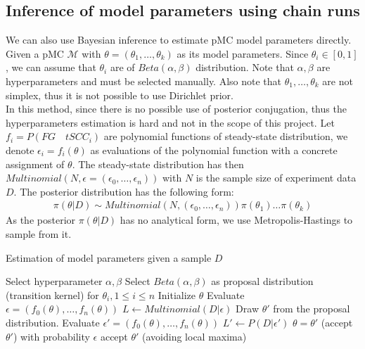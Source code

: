 \documentclass[12pt]{article}
\theoremstyle{definition}
\begin{document}
\subsection{Inference of model parameters using chain runs}
We can also use Bayesian inference to estimate pMC model parameters directly.
Given a pMC $\mathcal{M}$ with $\theta=(\theta_1,\ldots,\theta_k)$ as its model
parameters. Since $\theta_i \in [0,1]$, we can assume that $\theta_i$ are of
$Beta(\alpha, \beta)$ distribution. Note that $\alpha, \beta$ are
hyperparameters and must be selected manually. Also note that
$\theta_1,\ldots,\theta_k$ are not simplex, thus it is not possible to use
Dirichlet prior. \\
In this method, since there is no possible use of posterior conjugation, thus
the hyperparameters estimation is hard and not in the scope of this project. Let
$f_i = P (FG\quad tSCC_i)$ are polynomial functions of steady-state
distribution, we denote $\epsilon_i = f_i(\theta)$ as evaluations of the
polynomial function with a concrete assignment of $\theta$. The steady-state
distribution has then $Multinomial(N, \epsilon = (\epsilon_0,\ldots,\epsilon_n))$ with $N$
is the sample size of experiment data $D$. The posterior distribution has the
following form:
\begin{align*}
  \pi(\theta|D) \sim Multinomial(N, (\epsilon_0,\ldots,\epsilon_n))\pi(\theta_1)\ldots\pi(\theta_k)
\end{align*}
As the posterior $\pi(\theta|D)$ has no analytical form, we use
Metropolis-Hastings to sample from it.
\begin{algorithm}[H]
  \caption{Estimation of model parameters given a sample $D$}\label{exp_b}
  \begin{algorithmic}[1]
    \State Select hyperparameter $\alpha, \beta$
    \State Select $Beta(\alpha, \beta)$ as proposal distribution (transition
    kernel) for $\theta_i, 1\leq i \leq n$
    \State Initialize $\theta$
    \State Evaluate $\epsilon = (f_0(\theta),\ldots,f_n(\theta))$
    \State $L \leftarrow Multinomial(D|\epsilon)$
    \State Draw $\theta'$ from the proposal distribution.
    \State Evaluate $\epsilon' = (f_0(\theta),\ldots,f_n(\theta))$
    \State $L' \leftarrow P(D|\epsilon')$
    \State  $\theta = \theta'$ (accept $\theta'$)
    \Else
    \State with probability $\epsilon$ accept $\theta'$ (avoiding local maxima)
    \EndIf
    \EndWhile
    \EndProcedure
  \end{algorithmic}
\end{algorithm}
\end{document}
